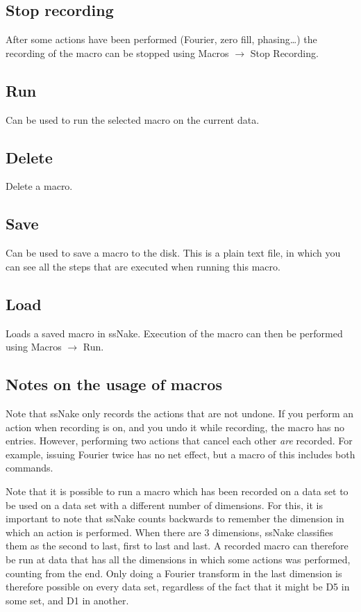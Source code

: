 \documentclass[11pt,a4paper]{article}
\begin{document}
\subsection{Stop recording}
After some actions have been performed (Fourier, zero fill, phasing\ldots   ) the recording of the macro can be stopped using Macros $\rightarrow$ Stop Recording.

\subsection{Run}
Can be used to run the selected macro on the current data.

\subsection{Delete}
Delete a macro.

\subsection{Save}
Can be used to save a macro to the disk. This is a plain text file, in which you can see all the steps that are executed when running this macro.

\subsection{Load}
Loads a saved macro in ssNake. Execution of the macro can then be performed using Macros $\rightarrow$ Run.

\subsection{Notes on the usage of macros}
Note that ssNake only records the actions that are not undone. If you perform an action when recording is on, and you undo it while recording, the macro has no entries. However, performing two actions that cancel each other \textit{are} recorded. For example, issuing Fourier twice has no net effect, but a macro of this includes both commands.

Note that it is possible to run a macro which has been recorded on a data set to be used on a data set with a different number of dimensions.
For this, it is important to note that ssNake counts backwards to remember the dimension in which an action is performed. When there are 3 dimensions, ssNake classifies them as the second to last, first to last and last. A recorded macro can therefore be run at data that has all the dimensions in which some actions was performed, counting from the end. Only doing a Fourier transform in the last dimension is therefore possible on every data set, regardless of the fact that it might be D5 in some set, and D1 in another.
\end{document}
